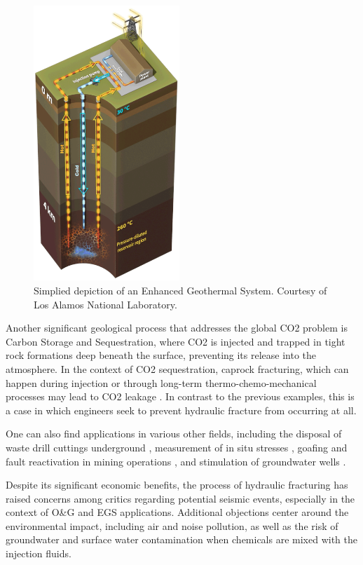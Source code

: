 \begin{figure}
    \includegraphics[width=5.5cm]{Chapter1/geothermal.png}
    \caption{Simplied depiction of an Enhanced Geothermal System. Courtesy of Los Alamos National Laboratory.}\label{egs-wrap}
\end{figure} 

Another significant geological process that addresses the global CO2 problem is Carbon Storage and Sequestration, where CO2 is injected and trapped in tight rock formations deep beneath the surface, preventing its release into the atmosphere. In the context of CO2 sequestration, caprock fracturing, which can happen during injection or through long-term thermo-chemo-mechanical processes may lead to CO2 leakage \cite{pan2014tough}. In contrast to the previous examples, this is a case in which engineers seek to prevent hydraulic fracture from occurring at all.   

One can also find applications in various other fields, including the disposal of waste drill cuttings underground \cite{moschovidis_mounds_2000}, measurement of in situ stresses \cite{desroches_stress_1995, desroches1993modelling}, goafing and fault reactivation in mining operations \cite{board_fluid_1992, zhang_propagation_2002}, and stimulation of groundwater wells \cite{noauthor_permeability_nodate,less_hydrofracture_1994}.

Despite its significant economic benefits, the process of hydraulic fracturing has raised concerns among critics regarding potential seismic events, especially in the context of O\&G and EGS applications. Additional objections center around the environmental impact, including air and noise pollution, as well as the risk of groundwater and surface water contamination when chemicals are mixed with the injection fluids.

